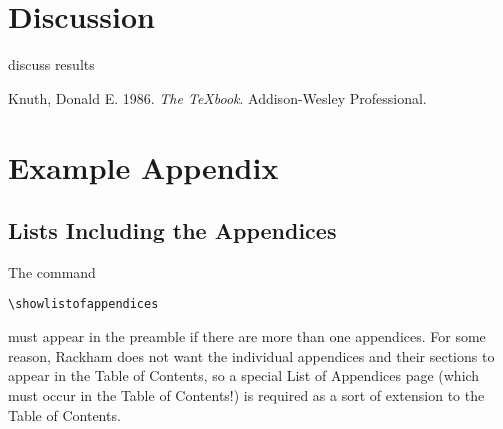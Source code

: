\documentclass[letterpaper,
thesis]{rackham}
\begin{document}

\hypertarget{discussion}{%
\chapter{Discussion}\label{discussion}}

discuss results

\hypertarget{refs}{}
\begin{CSLReferences}{1}{0}
\leavevmode{}%
Knuth, Donald E. 1986. \emph{The TeXbook}. Addison-Wesley Professional.

\end{CSLReferences}


\appendix
\chapter{Example Appendix}

\section{Lists Including the Appendices}
The command
\begin{verbatim}
\showlistofappendices
\end{verbatim}
must appear in the preamble if there are more than one appendices.  For
some reason, Rackham does not want the individual appendices and their
sections to appear in the Table of Contents, so a special List of
Appendices page (which must occur in the Table of Contents!) is required
as a sort of extension to the Table of Contents.


%
%
\end{document}
